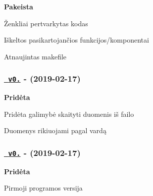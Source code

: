 {\bfseries{Pakeista}}


\begin{DoxyItemize}
\item Ženkliai pertvarkytas kodas
\item Iškeltos pasikartojančios funkcijos/komponentai
\item Atnaujintas makefile
\end{DoxyItemize}

\subsubsection*{\href{https://github.com/emilisb/OOP-2/releases/tag/v0.2}{\texttt{ v0.}} -\/ (2019-\/02-\/17)}

{\bfseries{Pridėta}}


\begin{DoxyItemize}
\item Pridėta galimybė skaityti duomenis iš failo
\item Duomenys rikiuojami pagal vardą
\end{DoxyItemize}

\subsubsection*{\href{https://github.com/emilisb/OOP-2/releases/tag/v0.1}{\texttt{ v0.}} -\/ (2019-\/02-\/17)}

{\bfseries{Pridėta}}


\begin{DoxyItemize}
\item Pirmoji programos versija 
\end{DoxyItemize}